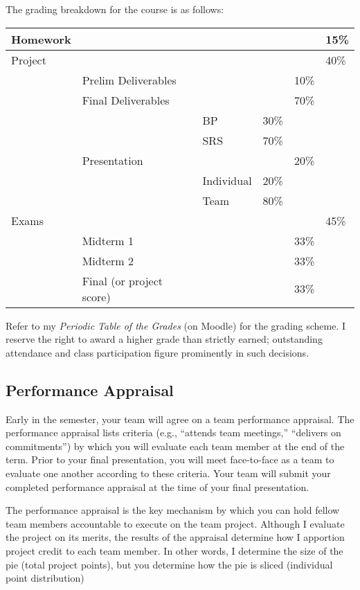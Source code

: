 \documentclass[11pt]{article}
\begin{document}
The grading breakdown for the course is as follows:
\begin{center}
  \begin{tabular}{llllll}
    \hline
    Homework &  &  &  &  & 15\%\\
    \hline
    Project &  &  &  &  & 40\%\\
             & Prelim Deliverables &  &  & 10\% & \\
             & Final Deliverables &  &  & 70\% & \\
             &  & BP & 30\% &  & \\
             &  & SRS & 70\% &  & \\
             & Presentation &  &  & 20\% & \\
             &  & Individual & 20\% &  & \\
             &  & Team & 80\% &  & \\
    \hline
    Exams &  &  &  &  & 45\%\\
             & Midterm 1 &  &  & 33\% & \\
             & Midterm 2 &  &  & 33\% & \\
             & Final (or project score) &  &  & 33\% & \\
    \hline
  \end{tabular}
\end{center}
Refer to my \emph{Periodic Table of the Grades} (on Moodle) for the grading scheme. I reserve
the right to award a higher grade than strictly earned; outstanding attendance and class
participation figure prominently in such decisions.

\subsection{Performance Appraisal}

Early in the semester, your team will agree on a team performance appraisal.
The performance appraisal lists criteria (e.g., ``attends team meetings,''
``delivers on commitments'') by which you will evaluate each team member
at the end of the term.
Prior to your final presentation,
you will meet face-to-face as a team to evaluate one another according to these criteria.
Your team will submit your completed performance appraisal
at the time of your final presentation.

The performance appraisal is the key mechanism
by which you can hold fellow team members accountable to execute on the team project.
Although I evaluate the project on its merits,
the results of the appraisal determine how I apportion project credit
to each team member.
In other words,
I determine the size of the pie (total project points),
but you determine how the pie is sliced (individual point distribution)
\end{document}
